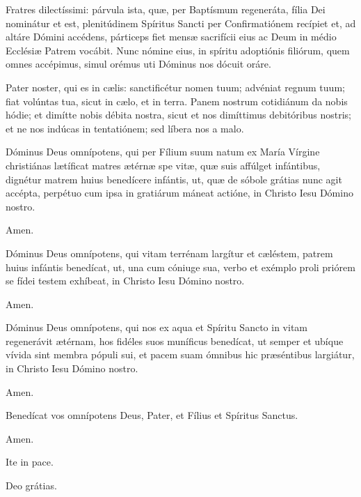 

Fratres dilectíssimi: párvula ista, quæ, per Baptísmum regeneráta,
fília Dei nominátur et est, plenitúdinem Spíritus
Sancti per Confirmatiónem recípiet et, ad altáre Dómini accédens,
párticeps fiet mensæ sacrifícii eius ac Deum in médio
Ecclésiæ Patrem vocábit. Nunc nómine eius, in spíritu adoptiónis
filiórum, quem omnes accépimus, simul orémus uti Dóminus nos dócuit
oráre.

Pater noster, qui es in cælis:
sanctificétur nomen tuum;
advéniat regnum tuum;
fiat volúntas tua, sicut in cælo, et in terra.
Panem nostrum cotidiánum da nobis hódie;
et dimítte nobis débita nostra,
sicut et nos dimíttimus debitóribus nostris;
et ne nos indúcas in tentatiónem;
sed líbera nos a malo.



Dóminus Deus omnípotens, qui per Fílium suum natum ex María Vírgine christiánas
lætíficat matres ætérnæ spe vitæ, quæ suis affúlget infántibus, dignétur matrem huius
benedícere infántis, ut, quæ de sóbole grátias nunc agit accépta, perpétuo cum ipsa
in gratiárum máneat actióne, in Christo Iesu Dómino nostro.

 Amen.

 Dóminus Deus omnípotens, qui vitam terrénam largítur et cæléstem, patrem huius infántis
benedícat, ut, una cum cóniuge sua, verbo et exémplo proli priórem se fídei testem exhíbeat,
in Christo Iesu Dómino nostro.

 Amen.

 Dóminus Deus omnípotens, qui nos ex aqua et Spíritu Sancto in vitam regenerávit
ætérnam, hos fidéles suos muníficus benedícat, ut semper et ubíque vívida sint membra pópuli sui,
et pacem suam ómnibus hic præséntibus largiátur, in Christo Iesu Dómino nostro.

 Amen.

 Benedícat vos omnípotens Deus,
Pater, et Fílius \grecross{} et Spíritus Sanctus.

 Amen.

 Ite in pace.

 Deo grátias.
